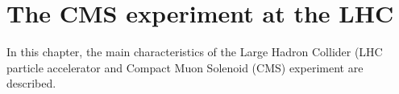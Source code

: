 \chapter{The CMS experiment at the LHC}\label{chap2}
\thispagestyle{empty}
In this chapter, the main characteristics of the Large Hadron Collider (LHC particle accelerator and Compact Muon Solenoid (CMS) experiment are described.




